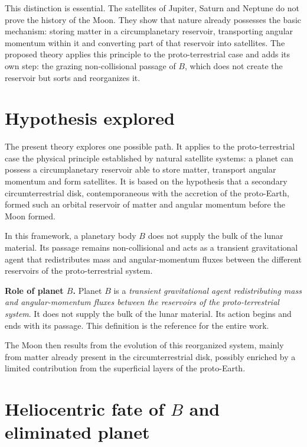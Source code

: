 \documentclass[11pt,a4paper,openany]{report}
\begin{document}
This distinction is essential. The satellites of Jupiter, Saturn and Neptune do not prove the
history of the Moon. They show that nature already possesses the basic mechanism: storing matter
in a circumplanetary reservoir, transporting angular momentum within it and converting part of
that reservoir into satellites. The proposed theory applies this principle to the proto-terrestrial
case and adds its own step: the grazing non-collisional passage of $B$, which does not create the
reservoir but sorts and reorganizes it.

\section{Hypothesis explored}

The present theory explores one possible path. It applies to the proto-terrestrial case the
physical principle established by natural satellite systems: a planet can possess a
circumplanetary reservoir able to store matter, transport angular momentum and form satellites.
It is based on the hypothesis that a secondary circumterrestrial disk, contemporaneous with the
accretion of the proto-Earth, formed such an orbital reservoir of matter and angular momentum
before the Moon formed.

In this framework, a planetary body $B$ does not supply the bulk of the lunar material. Its passage remains non-collisional and acts as a transient gravitational agent that
redistributes mass and angular-momentum fluxes between the different reservoirs of the
proto-terrestrial system.

\begin{definition}
\textbf{Role of planet $B$.} Planet $B$ is a \emph{transient gravitational agent redistributing mass
and angular-momentum fluxes between the reservoirs of the proto-terrestrial system}. It does not
supply the bulk of the lunar material. Its action begins and ends with its passage.
This definition is the reference for the entire work.
\end{definition}

The Moon then results from the evolution of this reorganized system, mainly from matter already
present in the circumterrestrial disk, possibly enriched by a limited contribution from the
superficial layers of the proto-Earth.

\section{Heliocentric fate of \texorpdfstring{$B$}{B} and eliminated planet}
\label{sec:destinB}
\end{document}
